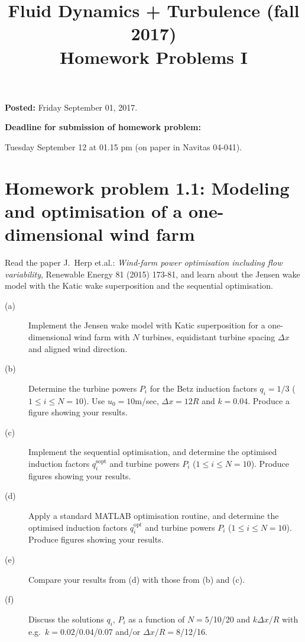 \documentclass[a4paper, 10pt]{article}
\title{Fluid Dynamics + Turbulence (fall 2017) \\ Homework Problems I}
\author{}
\date{}
\begin{document}
\maketitle

\large{
\textbf{Posted:}
Friday September 01, 2017.

\bigskip
\textbf{Deadline for submission of homework problem:}

Tuesday September 12 at 01.15 pm (on paper in Navitas 04-041).
}

\bigskip




\section[Homework problem 1]{Homework problem 1.1: Modeling and optimisation of a one-dimensional wind farm}

Read the paper J.\ Herp et.al.: {\it Wind-farm power optimisation including flow variability}, Renewable Energy 81 (2015) 173-81, and learn about the Jensen wake model with the Katic wake superposition and the sequential optimisation.

\begin{description}
\item[(a)]
Implement the Jensen wake model with Katic superposition for a one-dimensional wind farm with $N$ turbines, equidistant turbine spacing $\Delta{x}$ and aligned wind direction.

\item[(b)]
Determine the turbine powers $P_i$ for the Betz induction factors $q_i=1/3$ ($1\leq i\leq N=10$). Use $u_0=10$m/sec, $\Delta{x}=12R$ and $k=0.04$. Produce a figure showing your results.

\item[(c)]
Implement the sequential optimisation, and determine the optimised induction factors $q_i^\mathrm{sopt}$ and turbine powers $P_i$ ($1\leq i\leq N=10$). Produce figures showing your results.

\item[(d)]
Apply a standard MATLAB optimisation routine, and determine the optimised induction factors $q_i^\mathrm{opt}$ and turbine powers $P_i$ ($1\leq i\leq N=10$). Produce figures showing your results.

\item[(e)]
Compare your results from (d) with those from (b) and (c).

\item[(f)]
Discuss the solutions $q_i$, $P_i$ as a function of $N=5$/10/20 and $k\Delta{x}/R$ with e.g.\ $k=0.02$/0.04/0.07 and/or $\Delta{x}/R=8$/12/16.
\end{description}
\end{document}
